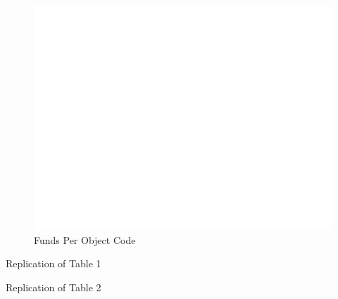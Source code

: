 \documentclass{article}
\begin{document}
\begin{figure}[h]
    \centering
    \includegraphics{../data/manual/histogram_code_count.png}
    \caption{Funds Per Object Code}
    \label{fig:image3}
\end{figure}

\begin{table}[ht]
    \centering
    \caption*{Replication of Table 1}
    \label{tab:table_complete}
      
\end{table}


\begin{table}[ht]
    \centering
    \caption*{Replication of Table 2}
    \label{tab:table2_complete}
      
\end{table}
    

%     

%     

%     

%     

%     
\end{document}
